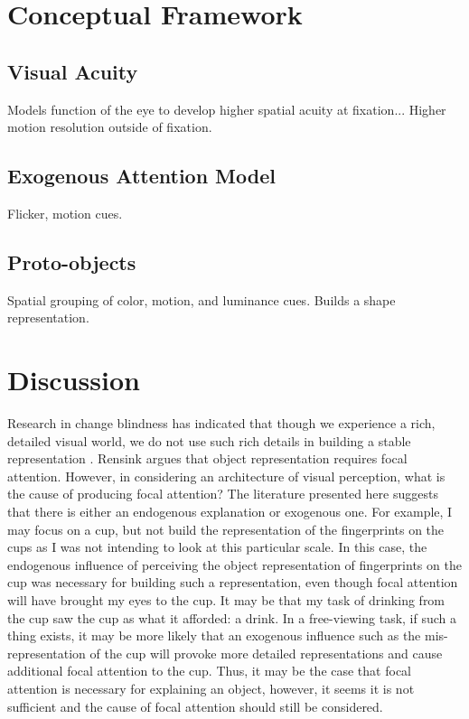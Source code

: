 \documentclass[a4paper,10pt,final]{ThesisStyle}
\begin{document}
\section{Conceptual Framework}

\subsection{Visual Acuity}

Models function of the eye to develop higher spatial acuity at fixation... Higher motion resolution outside of fixation.

\subsection{Exogenous Attention Model}

Flicker, motion cues.

\subsection{Proto-objects}

Spatial grouping of color, motion, and luminance cues.  Builds a shape representation.

\section{Discussion}

Research in change blindness has indicated that though we experience a rich, detailed visual world, we do not use such rich details in building a stable representation \cite{Simons1997}.  Rensink argues that object representation requires focal attention.  However, in considering an architecture of visual perception, what is the cause of producing focal attention?  The literature presented here suggests that there is either an endogenous explanation or exogenous one.  For example, I may focus on a cup, but not build the representation of the fingerprints on the cups as I was not intending to look at this particular scale.  In this case, the endogenous influence of perceiving the object representation of fingerprints on the cup was necessary for building such a representation, even though focal attention will have brought my eyes to the cup.  It may be that my task of drinking from the cup saw the cup as what it afforded: a drink.  In a free-viewing task, if such a thing exists, it may be more likely that an exogenous influence such as the mis-representation of the cup will provoke more detailed representations and cause additional focal attention to the cup.  Thus, it may be the case that focal attention is necessary for explaining an object, however, it seems it is not sufficient and the cause of focal attention should still be considered.  
\end{document}
